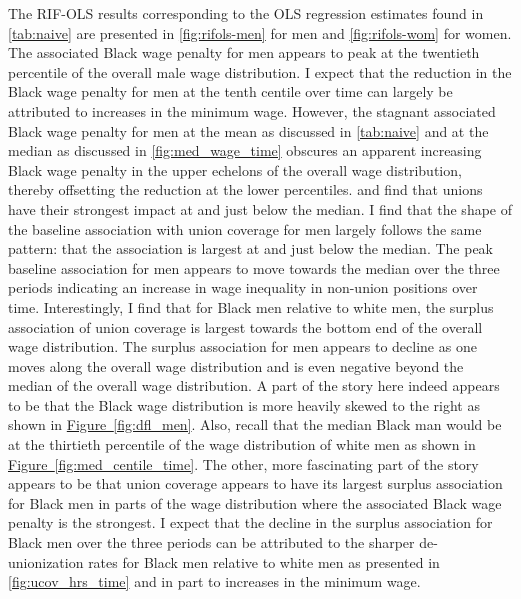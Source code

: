 \documentclass[11pt]{article}
\begin{document}
The RIF-OLS results corresponding to the OLS regression estimates found in \autoref{tab:naive} are presented in \autoref{fig:rifols-men} for men and \autoref{fig:rifols-wom} for women. The associated Black wage penalty for men appears to peak at the twentieth percentile of the overall male wage distribution. I expect that the reduction in the Black wage penalty for men at the tenth centile over time can largely be attributed to increases in the minimum wage. However, the stagnant associated Black wage penalty for men at the mean as discussed in \autoref{tab:naive} and at the median as discussed in \autoref{fig:med_wage_time} obscures an apparent increasing Black wage penalty in the upper echelons of the overall wage distribution, thereby offsetting the reduction at the lower percentiles. \citet{fll2021} and \citet{ffl2009} find that unions have their strongest impact at and just below the median. I find that the shape of the baseline association with union coverage for men largely follows the same pattern: that the association is largest at and just below the median. The peak baseline association for men appears to move towards the median over the three periods indicating an increase in wage inequality in non-union positions over time. Interestingly, I find that for Black men relative to white men, the surplus association of union coverage is largest towards the bottom end of the overall wage distribution. The surplus association for men appears to decline as one moves along the overall wage distribution and is even negative beyond the median of the overall wage distribution. A part of the story here indeed appears to be that the Black wage distribution is more heavily skewed to the right as shown in \hyperref[fig:dfl_men]{Figure~\ref*{fig:dfl_men}}. Also, recall that the median Black man would be at the thirtieth percentile of the wage distribution of white men as shown in \hyperref[fig:med_centile_time]{Figure~\ref*{fig:med_centile_time}}. The other, more fascinating part of the story appears to be that union coverage appears to have its largest surplus association for Black men in parts of the wage distribution where the associated Black wage penalty is the strongest. I expect that the decline in the surplus association for Black men over the three periods can be attributed to the sharper de-unionization rates for Black men relative to white men as presented in \autoref{fig:ucov_hrs_time} and in part to increases in the minimum wage.
\end{document}
